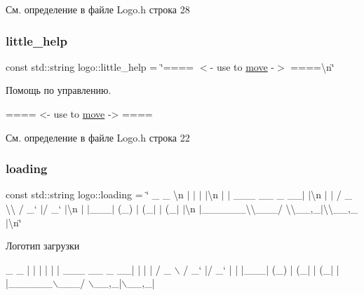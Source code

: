 См. определение в файле Logo.\+h строка 28

\mbox{\label{namespacelogo_adf18ab31906b644891fc8311df747a9d}} 
\subsubsection{\texorpdfstring{little\+\_\+help}{little\_help}}
{\footnotesize\ttfamily const std\+::string logo\+::little\+\_\+help = \char`\"{}==== $<$-\/ use to \hyperlink{namespacelogo_a03b6b80b5648e7dbbbf00b258df733b6}{move} -\/$>$ ====\textbackslash{}n\char`\"{}}

Помощь по управлению. 
\begin{DoxyCode}
==== <- use to \hyperlink{namespacelogo_a03b6b80b5648e7dbbbf00b258df733b6}{move} -> ====
\end{DoxyCode}
 

См. определение в файле Logo.\+h строка 22

\mbox{\label{namespacelogo_ad29ac81055f7eb3624a283f55af8d5ad}} 
\subsubsection{\texorpdfstring{loading}{loading}}
{\footnotesize\ttfamily const std\+::string logo\+::loading = \char`\"{} \+\_\+ \+\_\+ \textbackslash{}n $\vert$ $\vert$ $\vert$ $\vert$\textbackslash{}n $\vert$ $\vert$ \+\_\+\+\_\+\+\_\+ \+\_\+\+\_\+ \+\_\+ \+\_\+\+\_\+$\vert$ $\vert$\textbackslash{}n $\vert$ $\vert$ / \+\_\+ \textbackslash{}\textbackslash{} / \+\_\+` $\vert$/ \+\_\+` $\vert$\textbackslash{}n $\vert$ $\vert$\+\_\+\+\_\+\+\_\+$\vert$ (\+\_\+) $\vert$ (\+\_\+$\vert$ $\vert$ (\+\_\+$\vert$ $\vert$\textbackslash{}n $\vert$\+\_\+\+\_\+\+\_\+\+\_\+\+\_\+\+\_\+\textbackslash{}\textbackslash{}\+\_\+\+\_\+\+\_\+/ \textbackslash{}\textbackslash{}\+\_\+\+\_\+,\+\_\+$\vert$\textbackslash{}\textbackslash{}\+\_\+\+\_\+,\+\_\+$\vert$\textbackslash{}n\char`\"{}}

Логотип загрузки 
\begin{DoxyCode}
 \_                     \_ 
| |                   | |
| |     \_\_\_   \_\_ \_  \_\_| |
| |    / \_ \(\backslash\) / \_` |/ \_` |
| |\_\_\_| (\_) | (\_| | (\_| |
|\_\_\_\_\_\_\(\backslash\)\_\_\_/ \(\backslash\)\_\_,\_|\(\backslash\)\_\_,\_|  
\end{DoxyCode}
 

